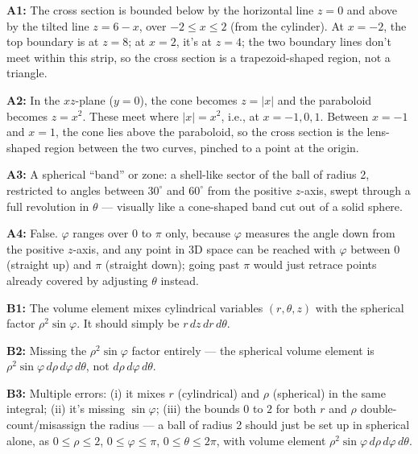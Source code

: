 \documentclass[11pt]{article}
\begin{document}
\textbf{A1:} The cross section is bounded below by the horizontal line $z=0$ and above by the tilted line $z=6-x$, over $-2\leq x\leq 2$ (from the cylinder). At $x=-2$, the top boundary is at $z=8$; at $x=2$, it's at $z=4$; the two boundary lines don't meet within this strip, so the cross section is a trapezoid-shaped region, not a triangle.


\textbf{A2:} In the $xz$-plane ($y=0$), the cone becomes $z=|x|$ and the paraboloid becomes $z=x^2$. These meet where $|x|=x^2$, i.e., at $x=-1,0,1$. Between $x=-1$ and $x=1$, the cone lies above the paraboloid, so the cross section is the lens-shaped region between the two curves, pinched to a point at the origin.


\textbf{A3:} A spherical ``band'' or zone: a shell-like sector of the ball of radius 2, restricted to angles between $30^\circ$ and $60^\circ$ from the positive $z$-axis, swept through a full revolution in $\theta$ --- visually like a cone-shaped band cut out of a solid sphere.

\textbf{A4:} False. $\varphi$ ranges over $0$ to $\pi$ only, because $\varphi$ measures the angle down from the positive $z$-axis, and any point in 3D space can be reached with $\varphi$ between $0$ (straight up) and $\pi$ (straight down); going past $\pi$ would just retrace points already covered by adjusting $\theta$ instead.

\textbf{B1:} The volume element mixes cylindrical variables $(r,\theta,z)$ with the spherical factor $\rho^2\sin\varphi$. It should simply be $r\,dz\,dr\,d\theta$.

\textbf{B2:} Missing the $\rho^2\sin\varphi$ factor entirely --- the spherical volume element is $\rho^2\sin\varphi\,d\rho\,d\varphi\,d\theta$, not $d\rho\,d\varphi\,d\theta$.

\textbf{B3:} Multiple errors: (i) it mixes $r$ (cylindrical) and $\rho$ (spherical) in the same integral; (ii) it's missing $\sin\varphi$; (iii) the bounds $0$ to $2$ for both $r$ and $\rho$ double-count/misassign the radius --- a ball of radius 2 should just be set up in spherical alone, as $0\leq\rho\leq 2$, $0\leq\varphi\leq\pi$, $0\leq\theta\leq 2\pi$, with volume element $\rho^2\sin\varphi\,d\rho\,d\varphi\,d\theta$.
\end{document}
